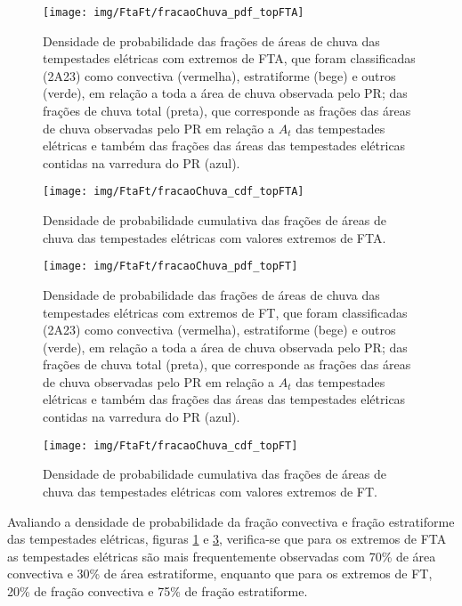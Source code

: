 \begin{figure}[!ht]
  \centering
  \texttt{[image: img/FtaFt/fracaoChuva\_pdf\_topFTA]}   
  \caption{Densidade de probabilidade das frações de áreas de chuva das tempestades elétricas com extremos de FTA, que foram classificadas (2A23) como convectiva (vermelha), estratiforme (bege) e outros (verde), em relação a toda a área de chuva observada pelo PR; das frações de chuva total (preta), que corresponde as frações das áreas de chuva observadas pelo PR em relação a $A_t$ das tempestades elétricas e também das frações das áreas das tempestades elétricas contidas na varredura do PR (azul).}
  \label{pdffracaoFTA}  
\end{figure}

\begin{figure}[!ht]
  \centering 
  \texttt{[image: img/FtaFt/fracaoChuva\_cdf\_topFTA]}
  \caption{Densidade de probabilidade cumulativa das frações de áreas de chuva das tempestades elétricas com valores extremos de FTA.}
  \label{cdffracaoFTA}
\end{figure}


\begin{figure}[!ht]
  \centering
  \texttt{[image: img/FtaFt/fracaoChuva\_pdf\_topFT]}   
  \caption{Densidade de probabilidade das frações de áreas de chuva das tempestades elétricas com extremos de FT, que foram classificadas (2A23) como convectiva (vermelha), estratiforme (bege) e outros (verde), em relação a toda a área de chuva observada pelo PR; das frações de chuva total (preta), que corresponde as frações das áreas de chuva observadas pelo PR em relação a $A_t$ das tempestades elétricas e também das frações das áreas das tempestades elétricas contidas na varredura do PR (azul).}
  \label{pdffracaoFT}  
\end{figure}

\begin{figure}[!ht]
  \centering 
  \texttt{[image: img/FtaFt/fracaoChuva\_cdf\_topFT]}
  \caption{Densidade de probabilidade cumulativa das frações de áreas de chuva das tempestades elétricas com valores extremos de FT.}
  \label{cdffracaoFT}
\end{figure}

Avaliando a densidade de probabilidade da fração convectiva e fração estratiforme das tempestades elétricas, figuras \ref{pdffracaoFTA} e \ref{pdffracaoFT}, verifica-se que para os extremos de FTA as tempestades elétricas são mais frequentemente observadas com 70\% de área convectiva e 30\% de área estratiforme, enquanto que para os extremos de FT, 20\% de fração convectiva e 75\% de fração estratiforme.

